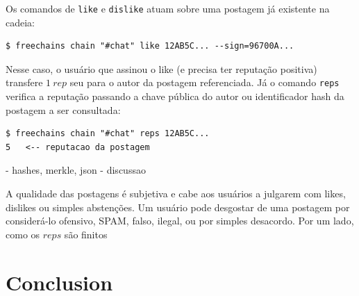 \documentclass[12pt]{article}
\begin{document}
Os comandos de \texttt{like} e \texttt{dislike} atuam sobre uma postagem já
existente na cadeia:
%
{\footnotesize
\begin{verbatim}
$ freechains chain "#chat" like 12AB5C... --sign=96700A...
\end{verbatim}
}
%
Nesse caso, o usuário que assinou o like (e precisa ter reputação positiva)
transfere $1~rep$ seu para o autor da postagem referenciada.
%
Já o comando \texttt{reps} verifica a reputação passando a chave pública do
autor ou identificador hash da postagem a ser consultada:
%
{\footnotesize
\begin{verbatim}
$ freechains chain "#chat" reps 12AB5C...
5   <-- reputacao da postagem
\end{verbatim}
}

- hashes, merkle, json
- discussao


A qualidade das postagens é subjetiva e cabe aos usuários a julgarem com likes,
dislikes ou simples abstenções.
Um usuário pode desgostar de uma postagem por considerá-lo ofensivo, SPAM,
falso, ilegal, ou por simples desacordo.
Por um lado, como os $reps$ são finitos

\section{Conclusion}
\label{sec.conclusion}
\end{document}
